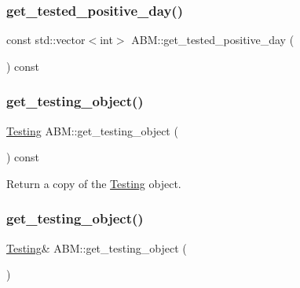 \mbox{\label{classABM_a4f716f9354ccd5be741d09d051c5364e}} 
\subsubsection{\texorpdfstring{get\+\_\+tested\+\_\+positive\+\_\+day()}{get\_tested\_positive\_day()}}
{\footnotesize\ttfamily const std\+::vector$<$int$>$ A\+B\+M\+::get\+\_\+tested\+\_\+positive\+\_\+day (\begin{DoxyParamCaption}{ }\end{DoxyParamCaption}) const\hspace{0.3cm}{\ttfamily [inline]}}

\mbox{\label{classABM_adc6c1467a7b40acfa82e653874514190}} 
\subsubsection{\texorpdfstring{get\+\_\+testing\+\_\+object()}{get\_testing\_object()}\hspace{0.1cm}{\footnotesize\ttfamily [1/2]}}
{\footnotesize\ttfamily \hyperlink{classTesting}{Testing} A\+B\+M\+::get\+\_\+testing\+\_\+object (\begin{DoxyParamCaption}{ }\end{DoxyParamCaption}) const\hspace{0.3cm}{\ttfamily [inline]}}



Return a copy of the \hyperlink{classTesting}{Testing} object. 

\mbox{\label{classABM_a3e26915cf8a4cf763599d4a8ad352d5e}} 
\subsubsection{\texorpdfstring{get\+\_\+testing\+\_\+object()}{get\_testing\_object()}\hspace{0.1cm}{\footnotesize\ttfamily [2/2]}}
{\footnotesize\ttfamily \hyperlink{classTesting}{Testing}\& A\+B\+M\+::get\+\_\+testing\+\_\+object (\begin{DoxyParamCaption}{ }\end{DoxyParamCaption})\hspace{0.3cm}{\ttfamily [inline]}}



